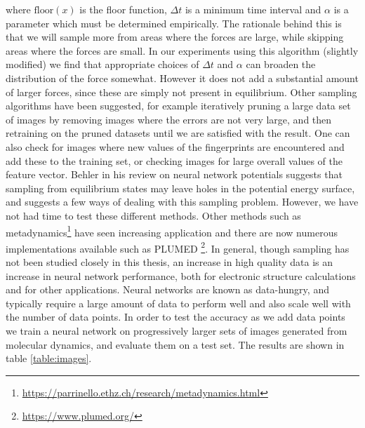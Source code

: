 where $\text{floor}(x)$ is the floor function,
$\Delta t$ is a minimum time interval and $\alpha$ is a parameter
which must be determined empirically.
The rationale behind this is that we will sample more from
areas where the forces are large, while skipping areas
where the forces are small.
In our experiments using this algorithm (slightly modified)
we find that appropriate choices of $\Delta t$ and $\alpha$
can broaden the distribution of the force somewhat.
However it does not add a substantial amount of larger forces, since
these are simply not present in equilibrium.
Other sampling algorithms have been suggested, for example iteratively
pruning a large data set of images by removing images where
the errors are not very large, and then retraining on the pruned datasets
until we are satisfied with the result.
One can also check for images where new values of the fingerprints
are encountered and add these to the training set, or checking
images for large overall values of the feature vector. 
Behler in his review\cite{behler2011neural} on neural network potentials
suggests that sampling from equilibrium states may leave holes
in the potential energy surface, and suggests a few ways of dealing
with this sampling problem.
However, we have not had time to test these different methods.
Other methods such as metadynamics\footnote{
\url{https://parrinello.ethz.ch/research/metadynamics.html}}
have seen increasing application and there are now numerous implementations
available such as PLUMED \footnote{\url{https://www.plumed.org/}}.
In general, though sampling has not been studied closely in this thesis,
an increase in high quality data is an increase in neural network
performance, both for electronic structure calculations
and for other applications.
Neural networks are known as data-hungry, and typically require
a large amount of data to perform well and also scale well
with the number of data points. 
In order to test the accuracy as we add data points
we train a neural network on progressively larger sets of images generated 
from molecular dynamics, and evaluate them on a test set.
The results are shown in table \ref{table:images}.

